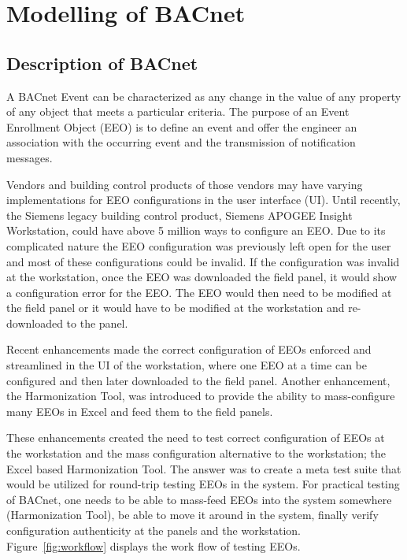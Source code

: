 \documentclass[conference]{IEEEtran}
\begin{document}
\section{Modelling of BACnet}

	\subsection{Description of BACnet}
	
	A BACnet Event can be characterized as any change in the value of any property of any object
that meets a particular criteria. The purpose of an Event Enrollment Object (EEO) is to define an
event and offer the engineer an association with the occurring event and the transmission of notification messages.

Vendors and building control products of those vendors may have varying implementations
for EEO configurations in the user interface (UI).
Until recently, the Siemens legacy building control product,
Siemens APOGEE Insight Workstation, could have above 5 million ways to configure an EEO.
Due to its complicated nature
the EEO configuration was previously left open for the user and most of these configurations could be invalid.
If the configuration was invalid at the workstation, once the EEO was downloaded the field panel, it would show a configuration error for the EEO. The EEO would then need to be modified at the field panel or it would have to be 
modified at the workstation and re-downloaded to the panel.

	Recent enhancements made the correct configuration of EEOs enforced and streamlined in the UI of the workstation, where one EEO at a time can be configured and then later downloaded to the field panel. 
Another enhancement, the Harmonization Tool, was introduced to provide the ability to mass-configure many
EEOs in Excel and feed them to the field panels.

	These enhancements created the need to test correct configuration of EEOs at the workstation and the mass configuration alternative to the workstation; the Excel based Harmonization Tool.  
The answer was to create a meta test suite that would be utilized for round-trip testing EEOs in the system.
For practical testing of BACnet, one needs to be able to mass-feed EEOs into the system somewhere (Harmonization Tool),
be able to move it around in the system, finally verify configuration authenticity at the panels and the workstation.
Figure~\ref{fig:workflow} displays the work flow of testing EEOs. 
                
\end{document}
